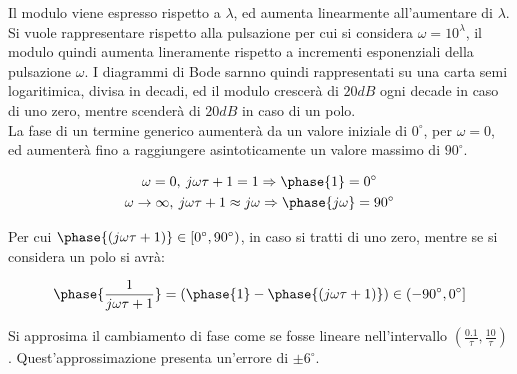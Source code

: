 \documentclass{article}
\numberwithin{equation}{subsection}
\begin{document}
\begin{center}
\end{center}

Il modulo viene espresso rispetto a $\lambda$, ed aumenta linearmente all'aumentare di $\lambda$. Si vuole rappresentare rispetto alla pulsazione per cui si considera 
$\omega=10^{\lambda}$, il modulo quindi aumenta lineramente rispetto a incrementi esponenziali della pulsazione $\omega$. I diagrammi di Bode sarnno quindi rappresentati 
su una carta semi logaritimica, divisa in decadi, ed il modulo crescerà di $20dB$ ogni decade in caso di uno zero, mentre scenderà di $20dB$ in caso di un polo. \\

La fase di un termine generico aumenterà da un valore iniziale di $0^{\circ}$, per $\omega=0$, ed aumenterà fino a raggiungere asintoticamente un valore massimo di 
$90^{\circ}$. 

\begin{gather}
    \omega=0,\: j\omega\tau+1=1\Rightarrow\phase{1}=0^{\circ}\\
    \omega\to\infty,\:j\omega\tau+1\approx j\omega\Rightarrow\phase{j\omega}=90^{\circ}
\end{gather}

Per cui $\phase{(j\omega\tau+1)}\in[0^{\circ},90^{\circ})$, in caso si tratti di uno zero, mentre se si considera un polo si avrà: 

\begin{equation}
    \phase{\displaystyle\frac{1}{j\omega\tau+1}}=\left(\phase{1}-\phase{(j\omega\tau+1)}\right)\in(-90^{\circ},0^{\circ}]
\end{equation}

Si approsima il cambiamento di fase come se fosse lineare nell'intervallo $\left(\displaystyle\frac{0.1}{\tau},\frac{10}{\tau}\right)$. 
Quest'approssimazione presenta un'errore di $\pm6^{\circ}$. 
\end{document}
